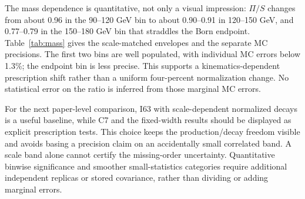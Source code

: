 \documentclass[11pt,a4paper]{article}
\begin{document}
The mass dependence is quantitative, not only a visual impression:
$\Pi/S$ changes from about 0.96 in the 90--120 GeV bin to about 0.90--0.91
in 120--150 GeV, and 0.77--0.79 in the 150--180 GeV bin that straddles the
Born endpoint. Table~\ref{tab:mass} gives the scale-matched envelopes and
the separate MC precisions. The first two bins are well populated, with
individual MC errors below 1.3\%; the endpoint bin is less precise. This
supports a kinematics-dependent prescription shift rather than a uniform
four-percent normalization change. No statistical error on the ratio is
inferred from those marginal MC errors.
\begin{table}[htbp]\centering\small
\resizebox{.97\linewidth}{!}{}
\caption{Selected native two-tag invariant-mass bins. The I63 column is a
deterministic scale-matched ratio envelope. The final columns are the
separate relative central MC errors of the two input spectra, not an error
on their ratio. The 150--180 GeV bin straddles the Born endpoint.}
\label{tab:mass}
\end{table}


For the next paper-level comparison, I63 with scale-dependent normalized
decays is a useful baseline, while C7 and the fixed-width results should
be displayed as explicit prescription tests. This choice keeps the
production/decay freedom visible and avoids basing a precision claim on an
accidentally small correlated band. A scale band alone cannot certify the
missing-order uncertainty. Quantitative binwise significance and smoother
small-statistics categories require additional independent replicas or
stored covariance, rather than dividing or adding marginal errors.

\clearpage
\end{document}
